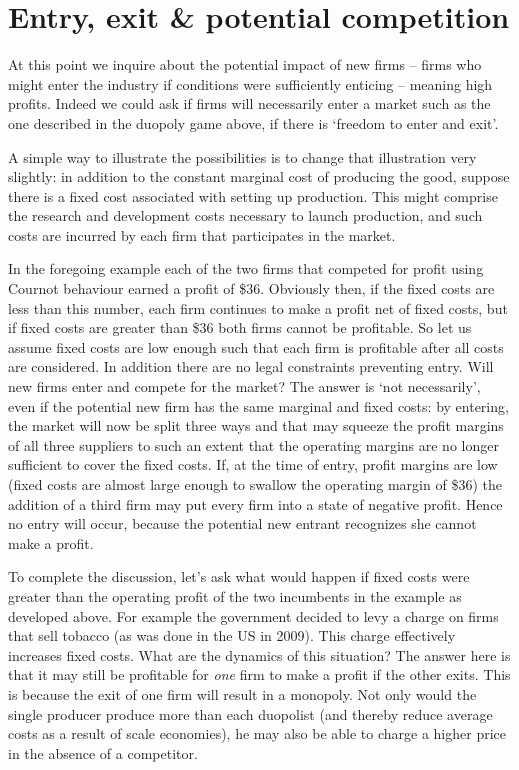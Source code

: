 \section{Entry, exit \& potential competition}\label{sec:ch11sec7}

At this point we inquire about the potential impact of new firms -- firms who might enter the industry if conditions were sufficiently enticing -- meaning high profits. Indeed we could ask if firms will necessarily enter a market such as the one described in the duopoly game above, if there is `freedom to enter and exit'. 

A simple way to illustrate the possibilities is to change that illustration very slightly: in addition to the constant marginal cost of producing the good, suppose there is a fixed cost associated with setting up production. This might comprise the research and development costs necessary to launch production, and such costs are incurred by each firm that participates in the market. 

In the foregoing example each of the two firms that competed for profit using Cournot behaviour earned a profit of \$36. Obviously then, if the fixed costs are less than this number, each firm continues to make a profit net of fixed costs, but if fixed costs are greater than \$36 both firms cannot be profitable. So let us assume fixed costs are low enough such that each firm is profitable after all costs are considered. In addition there are no legal constraints preventing entry. Will new firms enter and compete for the market? The answer is `not necessarily', even if the potential new firm has the same marginal and fixed costs: by entering, the market will now be split three ways and that may squeeze the profit margins of all three suppliers to such an extent that the operating margins are no longer sufficient to cover the fixed costs. If, at the time of entry, profit margins are low (fixed costs are almost large enough to swallow the operating margin of \$36) the addition of a third firm may put every firm into a state of negative profit. Hence no entry will occur, because the potential new entrant recognizes she cannot make a profit.

To complete the discussion, let's ask what would happen if fixed costs were greater than the operating profit of the two incumbents in the example as developed above. For example the government decided to levy a charge on firms that sell tobacco (as was done in the US in 2009). This charge effectively increases fixed costs. What are the dynamics of this situation? The answer here is that it may still be profitable for \textit{one} firm to make a profit if the other exits. This is because the exit of one firm will result in a monopoly. Not only would the single producer produce more than each duopolist (and thereby reduce average costs as a result of scale economies), he may also be able to charge a higher price in the absence of a competitor.


